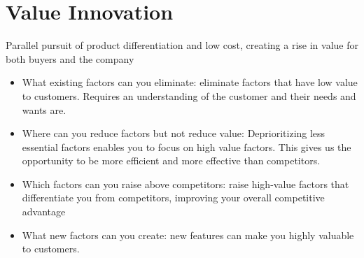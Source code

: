 \documentclass{article}
\begin{document}
  \section{Value Innovation}
  Parallel pursuit of product differentiation and low cost, creating a rise in value for both buyers and the company
  \begin{itemize}
    \item What existing factors can you eliminate: eliminate factors that have low value to customers. Requires an understanding of the customer and their needs and wants are.
    \item Where can you reduce factors but not reduce value: Deprioritizing less essential factors enables you to focus on high value factors. This gives us the opportunity to be more efficient and more effective than competitors.
    \item Which factors can you raise above competitors: raise high-value factors that differentiate you from competitors, improving your overall competitive advantage
    \item What new factors can you create: new features can make you highly valuable to customers.
  \end{itemize}
\end{document}
